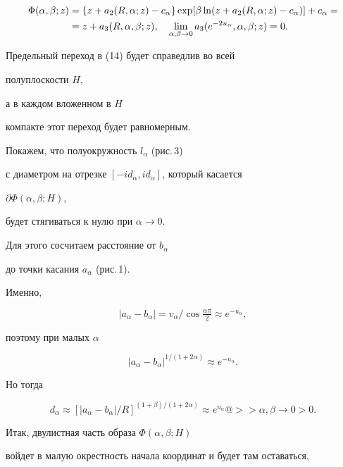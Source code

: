 \begin{pf}
\begin{align}
\Phi(\alpha,\beta;z)&=\{z+a_2(R,\alpha;z)-c_\alpha\}\exp 


[\beta\ln(z+a_2(R,\alpha;z)-c_\alpha)]+c_\alpha= \notag\\ 


&=z+a_3(R,\alpha,\beta;z),\quad 


\lim_{\alpha,\beta\to 0}a_3(e^{-2u_\alpha},\alpha,\beta;z)=0. 


\end{align} 


Предельный переход в (14) будет справедлив во всей 


полуплоскости $H$, 


а в каждом вложенном в $H$ 


компакте этот переход будет равномерным. 


 


Покажем, что полуокружность $l_{\alpha}$ (рис.\,3)


с диаметром на отрезке $[-id_\alpha,id_\alpha]$, который касается 


$\partial\Phi(\alpha,\beta;H)$, 


будет стягиваться к нулю при $\alpha \to 0$. 


Для этого сосчитаем расстояние от $b_\alpha$ 


до точки касания $a_{\alpha}$ (рис.\,1). 


Именно, 


$$ 


|a_\alpha-b_\alpha|=v_\alpha/\cos\tfrac{\alpha\pi}{2}\approx 


e^{-u_\alpha}, 


$$ 


поэтому при малых $\alpha$ 


$$ 


|a_\alpha-b_\alpha|^{1/(1+2\alpha)}\approx e^{-u_\alpha}. 


$$ 


Но тогда 


$$ 


d_\alpha\approx[|a_\alpha-b_\alpha|/R]^{(1+\beta)/(1+2\alpha)} 


\approx e^{u_\alpha}@>>{\alpha,\beta\to 0}> 0. 


$$ 





Итак, двулистная часть образа $\Phi(\alpha,\beta;H)$ 


войдет в малую окрестность начала координат и будет там оставаться, 



\end{pf}
